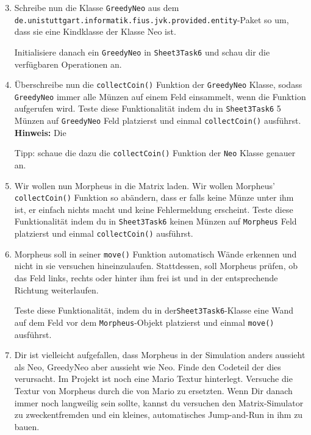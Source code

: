 \begin{enumerate}\setcounter{enumi}{2}
\item Schreibe nun die Klasse \lstinline{GreedyNeo} aus dem \texttt{de.unistuttgart.informatik.fius.jvk.provided.entity}-Paket so um, dass sie eine Kindklasse der Klasse Neo ist.

Initialisiere danach ein \lstinline{GreedyNeo} in \lstinline{Sheet3Task6} und schau dir die verfügbaren Operationen an.

\item Überschreibe nun die \lstinline{collectCoin()} Funktion der \lstinline{GreedyNeo} Klasse, sodass \lstinline{GreedyNeo} immer alle Münzen auf einem Feld einsammelt, wenn die Funktion aufgerufen wird.
Teste diese Funktionalität indem du in \lstinline{Sheet3Task6} 5 Münzen auf \lstinline{GreedyNeo} Feld platzierst und einmal \lstinline{collectCoin()} ausführst.
\textbf{Hinweis:} Die

Tipp: schaue die dazu die \lstinline{collectCoin()} Funktion der \lstinline{Neo} Klasse genauer an.

\item Wir wollen nun Morpheus in die Matrix laden.
Wir wollen Morpheus' \lstinline{collectCoin()} Funktion so abändern, dass er falls keine Münze unter ihm ist, er einfach nichts macht und keine Fehlermeldung erscheint.
Teste diese Funktionalität indem du in \lstinline{Sheet3Task6} keinen Münzen auf \lstinline{Morpheus} Feld platzierst und einmal \lstinline{collectCoin()} ausführst.

\item Morpheus soll in seiner \lstinline{move()} Funktion automatisch Wände erkennen und nicht in sie versuchen hineinzulaufen.
Stattdessen, soll Morpheus prüfen, ob das Feld links, rechts oder hinter ihm frei ist und in der entsprechende Richtung weiterlaufen.

Teste diese Funktionalität, indem du in der\lstinline{Sheet3Task6}-Klasse eine Wand auf dem Feld vor dem \lstinline{Morpheus}-Objekt platzierst und einmal \lstinline{move()} ausführst.

\item \optional Dir ist vielleicht aufgefallen, dass Morpheus in der Simulation anders aussieht als Neo, GreedyNeo aber aussieht wie Neo.
Finde den Codeteil der dies verursacht.
Im Projekt ist noch eine Mario Textur hinterlegt.
Versuche die Textur von Morpheus durch die von Mario zu ersetzten.
Wenn Dir danach immer noch langweilig sein sollte, kannst du versuchen den Matrix-Simulator zu zweckentfremden und ein kleines, automatisches Jump-and-Run in ihm zu bauen.

\end{enumerate}
